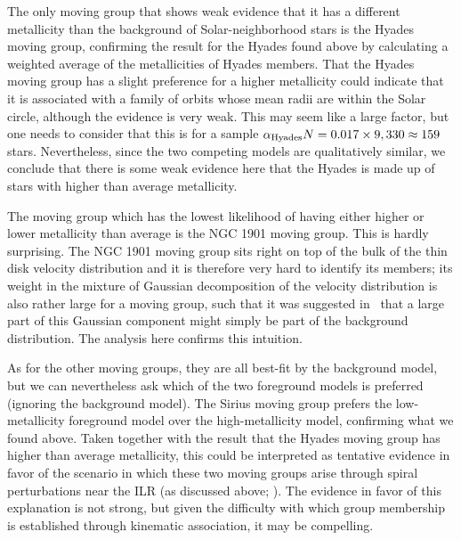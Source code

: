 The only moving group that shows weak evidence that it has a different
metallicity than the background of Solar-neighborhood stars is the
Hyades moving group, confirming the result for the Hyades found above
by calculating a weighted average of the metallicities of Hyades
members. That the Hyades moving group has a slight preference for a
higher metallicity could indicate that it is associated with a family
of orbits whose mean radii are within the Solar circle, although the
evidence is very weak. This may seem like a large factor, but one
needs to consider that this is for a sample $\alpha_{\mathrm{Hyades}}
N = 0.017 \times 9,330 \approx 159$ stars. Nevertheless,
since the two competing models are qualitatively similar, we conclude
that there is some weak evidence here that the Hyades is made up of
stars with higher than average metallicity.

The moving group which has the lowest likelihood of having either
higher or lower metallicity than average is the NGC 1901 moving
group. This is hardly surprising. The NGC 1901 moving group sits right
on top of the bulk of the thin disk velocity distribution and it is
therefore very hard to identify its members; its weight in the mixture
of Gaussian decomposition of the velocity distribution is also rather
large for a moving group, such that it was suggested in \bhr\ that a
large part of this Gaussian component might simply be part of the
background distribution. The analysis here confirms this intuition.

As for the other moving groups, they are all best-fit by the
background model, but we can nevertheless ask which of the two
foreground models is preferred (ignoring the background model). The
Sirius moving group prefers the low-metallicity foreground model over
the high-metallicity model, confirming what we found above. Taken
together with the result that the Hyades moving group has higher than
average metallicity, this could be interpreted as tentative evidence
in favor of the scenario in which these two moving groups arise
through spiral perturbations near the ILR (as discussed above;
\citealt{Quillen05a}). The evidence in favor of this explanation is
not strong, but given the difficulty with which group membership is
established through kinematic association, it may be compelling.

